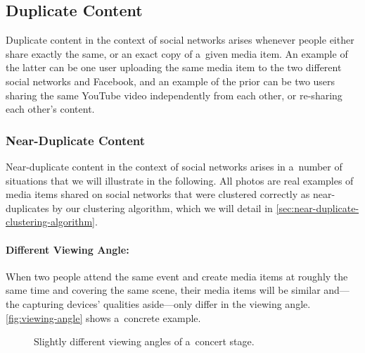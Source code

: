 \subsection{Duplicate Content}
\label{sec:duplicate-content}

Duplicate content in the context of social networks
arises whenever people either share exactly the same,
or an exact copy of a~given media item.
An example of the latter can be one user uploading the same media item
to the two different social networks \googleplus and Facebook,
and an example of the prior can be two users sharing the same
YouTube video independently from each other, or re-sharing each other's content.

\subsubsection{Near-Duplicate Content}
\label{sec:near-duplicate-content}

Near-duplicate content in the context of social networks
arises in a~number of situations
that we will illustrate in the following.
All photos are real examples of media items shared on social networks
that were clustered correctly as near-duplicates
by our clustering algorithm, which we will detail in
\autoref{sec:near-duplicate-clustering-algorithm}.

\paragraph{Different Viewing Angle:}

When two people attend the same event
and create media items at roughly the same time
and covering the same scene,
their media items will be similar
and---the capturing devices' qualities aside---only differ in the viewing angle. 
\autoref{fig:viewing-angle} shows a~concrete example.

\begin{figure}[h!]
  \centering
  \caption{Slightly different viewing angles of a~concert stage.}
  \label{fig:viewing-angle}  
\end{figure}

